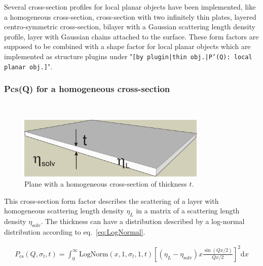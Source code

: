 Several cross-section profiles for local planar objects have been implemented,
like a homogeneous cross-section,
cross-section with two infinitely thin plates,
layered centro-symmetric cross-section,
bilayer with a Gaussian scattering length density profile,
layer with Gaussian chains attached to the surface.
These form factors are supposed to be combined with a shape factor for
local planar objects which are implemented as structure  plugins
under "\texttt{[by plugin|thin obj.|P'(Q): local planar
obj.]}".

\clearpage

\subsubsection{Pcs(Q) for a homogeneous cross-section}
\label{plugin:Pcs:homogeneousXS} ~\\

\begin{figure}[htb]
\begin{center}
\includegraphics[width=0.802\textwidth,height=0.265\textwidth]{../images/form_factor/anisotropic/Pcs_homogeneousXS_txt.png}
\end{center}
\caption{Plane with a homogeneous cross-section of thickness $t$.}
\label{fig:homogeneousXS}
\end{figure}

This cross-section form factor describes the scattering of a layer with homogeneous
scattering length density $\eta_L$ in a matrix of a scattering length density $\eta_\textrm{solv}$.
The thickness can have a distribution described by a log-normal distribution according to eq.\ \ref{eq:LogNormal}.

\begin{align}
P_\text{cs}(Q,\sigma_{t},t) = \int_0^\infty \textrm{LogNorm}(x,1,\sigma_{t},1,t)
    \left[ \left(\eta_L-\eta_\textrm{solv}\right) x \frac{\sin(Qx/2)}{Qx/2} \right]^2\textrm{d}x
\end{align}

\vspace{5mm}

